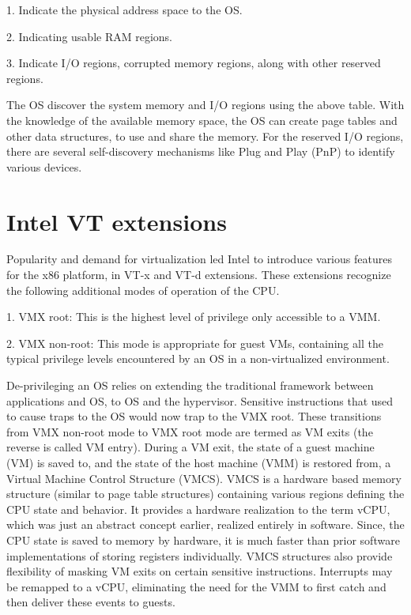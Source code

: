 1. Indicate the physical address space to the OS.

2. Indicating usable RAM regions.

3. Indicate I/O regions, corrupted memory regions, along with other reserved regions.

The OS discover the system memory and I/O regions using the above table. With the knowledge of the available memory space, the OS can create page tables and other data structures, to use and share the memory. For the reserved I/O regions, there are several self-discovery mechanisms like Plug and Play (PnP) to identify various devices. 


\section{Intel VT extensions}


Popularity and demand for virtualization led Intel to introduce various features for the x86 platform, in VT-x \cite{intel_manual} and VT-d \cite{intelvtd} extensions. These extensions recognize the following additional modes of operation of the CPU.

1. VMX root: This is the highest level of privilege only accessible to a VMM.

2. VMX non-root: This mode is appropriate for guest VMs, containing all the typical privilege levels encountered by an OS in a non-virtualized environment.

De-privileging an OS relies on extending the traditional framework between applications and OS, to OS and the hypervisor. Sensitive instructions that used to cause traps to the OS would now trap to the VMX root. These transitions from VMX non-root mode to VMX root mode are termed as VM exits (the reverse is called VM entry). During a VM exit, the state of a guest machine (VM) is saved to, and the state of the host machine (VMM) is restored from, a Virtual Machine Control Structure (VMCS). VMCS is a hardware based memory structure (similar to page table structures) containing various regions defining the CPU state and behavior. It provides a hardware realization to the term vCPU, which was just an abstract concept earlier, realized entirely in software. Since, the CPU state is saved to memory by hardware, it is much faster than prior software implementations of storing registers individually. VMCS structures also provide flexibility of masking VM exits on certain sensitive instructions. Interrupts may be remapped to a vCPU, eliminating the need for the VMM to first catch and then deliver these events to guests.

